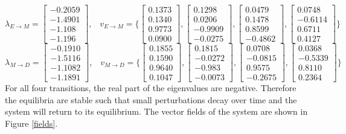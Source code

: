 \documentclass[11pt]{article}
\begin{document}
\[\lambda_{E \to M}=\begin{bmatrix}-0.2059\\-1.4901\\-1.108\\-1.196\end{bmatrix}
\text{,} \quad
v_{E \to M}=\Biggl\{
\begin{bmatrix}0.1373\\0.1340 \\0.9773\\0.0900 \end{bmatrix},
\begin{bmatrix}0.1298\\0.0206\\-0.9909\\-0.0275\end{bmatrix}, 
\begin{bmatrix}0.0479\\0.1478\\0.8599\\-0.4862\end{bmatrix}, 
\begin{bmatrix}0.0748\\-0.6114\\0.6711\\0.4127\end{bmatrix} \Biggr\}
\]
\[\lambda_{M \to D}=\begin{bmatrix}-0.1910\\  -1.5116\\ -1.1082\\ -1.1891\end{bmatrix}
\text{,} \quad
v_{M \to D}=\Biggl\{
\begin{bmatrix}0.1855\\ 0.1590\\  0.9640\\  0.1047\end{bmatrix},
\begin{bmatrix}0.1815\\ -0.0272\\ -0.983\\  -0.0073\end{bmatrix}, 
\begin{bmatrix}0.0708\\ -0.0815\\  0.9575\\ -0.2675\end{bmatrix}, 
\begin{bmatrix}0.0368\\ -0.5339\\  0.8110\\   0.2364\end{bmatrix} \Biggr\}
\]
For all four transitions, the real part of the eigenvalues are negative. Therefore the equilibria are stable such that small perturbations decay over time and the system will return to its equilibrium. The vector fields of the system are shown in Figure \ref{fields}.
\end{document}
